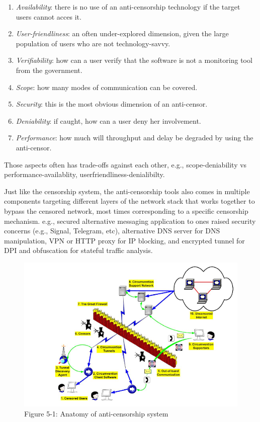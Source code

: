 \documentclass[nonacm,sigplan,screen]{acmart}
\begin{document}
\begin{enumerate}
\def\labelenumi{\arabic{enumi}.}
\item
  \emph{Availability}: there is no use of an anti-censorship technology
  if the target users cannot acces it.
\item
  \emph{User-friendliness}: an often under-explored dimension, given the
  large population of users who are not technology-savvy.
\item
  \emph{Verifiability}: how can a user verify that the software is not a
  monitoring tool from the government.
\item
  \emph{Scope}: how many modes of communication can be covered.
\item
  \emph{Security}: this is the most obvious dimension of an anti-censor.
\item
  \emph{Deniability}: if caught, how can a user deny her involvement.
\item
  \emph{Performance}: how much will throughput and delay be degraded by
  using the anti-censor.
\end{enumerate}

Those aspects often has trade-offs against each other, e.g.,
scope-deniability vs performance-availablity,
userfriendliness-denialibilty.

Just like the censorship system, the anti-censorship tools also comes in
multiple components targeting different layers of the network stack that
works together to bypass the censored network, most times corresponding
to a specific censorship mechanism. e.g., secured alternative messaging
application to ones raised security concerns (e.g., Signal, Telegram,
etc), alternative DNS server for DNS manipulation, VPN or HTTP proxy for
IP blocking, and encrypted tunnel for DPI and obfuscation for stateful
traffic analysis. \cite{48_globalDefeat}

\begin{figure}
\centering
\includegraphics[width=\textwidth]{./res/5.1-anatomy.png}
\caption{Figure 5-1: Anatomy of anti-censorship system}
\end{figure}
\end{document}
